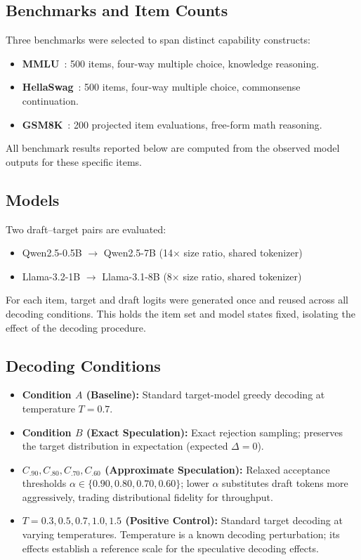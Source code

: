 \documentclass{article}
\begin{document}
\subsection{Benchmarks and Item Counts}

Three benchmarks were selected to span distinct capability constructs:
\begin{itemize}
    \item \textbf{MMLU}~\citep{hendrycks2021mmlu}: 500 items, four-way multiple choice, knowledge reasoning.
    \item \textbf{HellaSwag}~\citep{zellers2019hellaswag}: 500 items, four-way multiple choice, commonsense continuation.
    \item \textbf{GSM8K}~\citep{cobbe2021gsm8k}: 200 projected item evaluations, free-form math reasoning.
\end{itemize}

All benchmark results reported below are computed from the observed model outputs for these specific items.

\subsection{Models}

Two draft--target pairs are evaluated:
\begin{itemize}
    \item Qwen2.5-0.5B $\rightarrow$ Qwen2.5-7B (14$\times$ size ratio, shared tokenizer)
    \item Llama-3.2-1B $\rightarrow$ Llama-3.1-8B (8$\times$ size ratio, shared tokenizer)
\end{itemize}

For each item, target and draft logits were generated once and reused across all decoding conditions. This holds the item set and model states fixed, isolating the effect of the decoding procedure.

\subsection{Decoding Conditions}

\begin{itemize}
    \item \textbf{Condition $A$ (Baseline):} Standard target-model greedy decoding at temperature $T{=}0.7$.
    \item \textbf{Condition $B$ (Exact Speculation):} Exact rejection sampling; preserves the target distribution in expectation (expected $\Delta = 0$).
    \item \textbf{$C_{.90}, C_{.80}, C_{.70}, C_{.60}$ (Approximate Speculation):} Relaxed acceptance thresholds $\alpha \in \{0.90, 0.80, 0.70, 0.60\}$; lower $\alpha$ substitutes draft tokens more aggressively, trading distributional fidelity for throughput.
    \item \textbf{$T{=}0.3, 0.5, 0.7, 1.0, 1.5$ (Positive Control):} Standard target decoding at varying temperatures. Temperature is a known decoding perturbation; its effects establish a reference scale for the speculative decoding effects.
\end{itemize}
\end{document}
